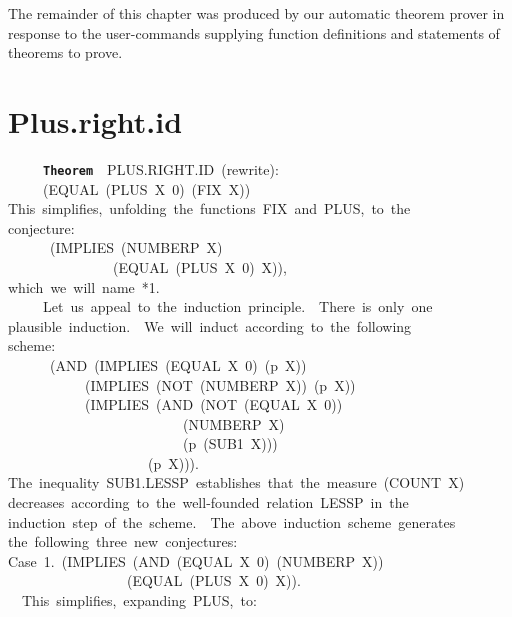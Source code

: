 \documentclass[11pt]{book}
\newenvironment{pubasis}{\begin{flushleft}\ttfamily\small}{\normalsize\rmfamily\end{flushleft}}
\newcommand{\axiomordefinition}[1]{\vspace{6pt}\texttt{\textbf{#1}}}
\newcommand{\pubdefaulttextsize}{\large}
\begin{document}
The remainder of this chapter was produced by our automatic
theorem prover in response to the user-commands supplying
function definitions and statements of theorems to prove.
\section{Plus.right.id}
\pubdefaulttextsize
\begin{pubasis}
~~~~~\axiomordefinition{Theorem}~~PLUS.RIGHT.ID~(rewrite):\\
~~~~~(EQUAL~(PLUS~X~0)~(FIX~X))\\

This~simplifies,~unfolding~the~functions~FIX~and~PLUS,~to~the\\
conjecture:\\

~~~~~~(IMPLIES~(NUMBERP~X)\\
~~~~~~~~~~~~~~~(EQUAL~(PLUS~X~0)~X)),\\

which~we~will~name~*1.\\

~~~~~Let~us~appeal~to~the~induction~principle.~~There~is~only~one\\
plausible~induction.~~We~will~induct~according~to~the~following\\
scheme:\\
~~~~~~(AND~(IMPLIES~(EQUAL~X~0)~(p~X))\\
~~~~~~~~~~~(IMPLIES~(NOT~(NUMBERP~X))~(p~X))\\
~~~~~~~~~~~(IMPLIES~(AND~(NOT~(EQUAL~X~0))\\
~~~~~~~~~~~~~~~~~~~~~~~~~(NUMBERP~X)\\
~~~~~~~~~~~~~~~~~~~~~~~~~(p~(SUB1~X)))\\
~~~~~~~~~~~~~~~~~~~~(p~X))).\\
The~inequality~SUB1.LESSP~establishes~that~the~measure~(COUNT~X)\\
decreases~according~to~the~well-founded~relation~LESSP~in~the\\
induction~step~of~the~scheme.~~The~above~induction~scheme~generates\\
the~following~three~new~conjectures:\\

Case~1.~(IMPLIES~(AND~(EQUAL~X~0)~(NUMBERP~X))\\
~~~~~~~~~~~~~~~~~(EQUAL~(PLUS~X~0)~X)).\\

~~This~simplifies,~expanding~PLUS,~to:\\


\end{pubasis}
\end{document}

